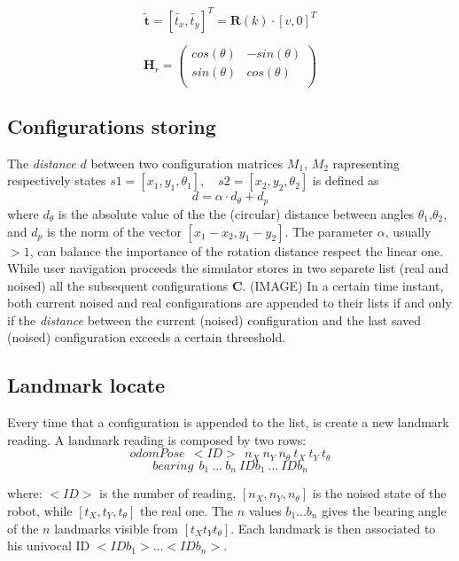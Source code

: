 \[ 
\tilde{\textbf{t}} = [\tilde{t_x},\tilde{t_y}]^T = \textbf{R}(k) \cdot [v,0]^T
\]

\[ 
\textbf{H}_r =
\left( \begin{array}{cc}
  cos(\theta)  & -sin(\theta)\\ 
  sin(\theta)  & cos(\theta) \\
\end{array} \right)
\]


\subsection{Configurations storing}
The \textit{distance} $d$ between two configuration matrices $M_1$, $M_2$ rapresenting respectively states $s1 = [x_1,y_1,\theta_1]$, ~ $s2 = [x_2,y_2,\theta_2]$
is defined as
\[ 
d = \alpha \cdot d_{\theta} + d_p
\]
where $d_{\theta}$ is the absolute value of the the (circular) distance between angles $\theta_1$,$\theta_2$,
and $d_p$ is the norm of the vector $[x_1 - x_2,y_1 - y_2]$.
The parameter $\alpha$, usually $> 1$, can balance the importance of the rotation distance respect the linear one.\\
While user navigation proceeds the simulator stores in two separete list (real and noised) all the subsequent configurations $\textbf{C}$.
(IMAGE)
In a certain time instant, both current noised and real configurations are appended to their lists if and only if the \textit{distance} between the current (noised) configuration 
and the last saved (noised) configuration exceeds a certain threeshold.
\\
\subsection{Landmark locate}
Every time that a configuration is appended to the list, is create a new landmark reading.
A landmark reading is composed by two rows:\\
\[ 
odomPose ~~ <ID> ~~ n_X ~ n_Y ~  n_{\theta} ~  t_X ~  t_Y ~ t_{\theta}
\]
\[
bearing ~~ b_1 ~ ... ~ b_n ~ IDb_1 ~ ... ~ IDb_n 
\]

where:
\textit{$<ID>$} is the number of reading, $[n_X, n_Y, n_{\theta}]$ is the noised state of the robot, while $[t_X, t_Y, t_{\theta}]$ the real one.
The $n$ values $ b_1 ... b_n$ gives the bearing angle of the $n$ landmarks visible from $[t_X t_Y t_{\theta}]$. Each landmark is then associated to his univocal ID 
$<IDb_1> ... <IDb_n>$.

